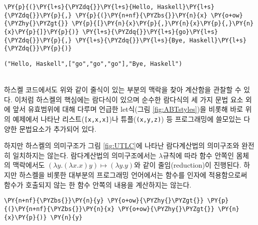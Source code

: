     
    \begin{tcolorbox}[breakable, size=fbox, boxrule=1pt, pad at break*=1mm,colback=cellbackground, colframe=cellborder, top=.75ex]
\begin{Verbatim}[commandchars=\\\{\}]
\PY{p}{(}\PY{l+s}{\PYZdq{}}\PY{l+s}{Hello, Haskell}\PY{l+s}{\PYZdq{}}\PY{p}{,} \PY{p}{(}\PY{n+nf}{\PYZbs{}}\PY{n}{x} \PY{o+ow}{\PYZhy{}\PYZgt{}} \PY{p}{[}\PY{n}{x}\PY{p}{,}\PY{n}{x}\PY{p}{,}\PY{n}{x}\PY{p}{]}\PY{p}{)} \PY{l+s}{\PYZdq{}}\PY{l+s}{go}\PY{l+s}{\PYZdq{}}\PY{p}{,} \PY{l+s}{\PYZdq{}}\PY{l+s}{Bye, Haskell}\PY{l+s}{\PYZdq{}}\PY{p}{)}
\end{Verbatim}
\end{tcolorbox}

    
    \begin{Verbatim}[commandchars=\\\{\}]
("Hello, Haskell",["go","go","go"],"Bye, Haskell")
    \end{Verbatim}

    ~\\[-2ex]\noindent
    하스켈 코드에서도 위와 같이 줄식이 있는 부분의 맥락을 찾아 계산함을
관찰할 수 있다. 이처럼 하스켈의 핵심에는 람다식이 있으며 순수한 람다식의
세 가지 문법 요소 외에 앞서 유효범위에 대해 다루며 언급한 let식(그림
\ref{fig:ABTstyles})을 비롯해 바로 위의 예제에서 나타난
리스트(\texttt{{[}x,x,x{]}})나 튜플(\texttt{(x,y,z)}) 등 프로그래밍에
쓸모있는 다양한 문법요소가 추가되어 있다.

    하지만 하스켈의 의미구조가 그림 \ref{fig:UTLC}에 나타난 람다계산법의
의미구조와 완전히 일치하지는 않는다. 람다계산법의 의미구조에서는
\(\lambda\)규칙에 따라 함수 안쪽인 몸체의 맥락에서도
\((\lambda y.(\lambda x.x) y) \longmapsto (\lambda y.y)\)와 같이
줄임(reduction)이 진행된다. 하지만 하스켈을 비롯한 대부분의 프로그래밍
언어에서는 함수를 인자에 적용함으로써 함수가 호출되지 않는 한 함수
안쪽의 내용을 계산하지는 않는다.

    \begin{tcolorbox}[breakable, size=fbox, boxrule=1pt, pad at break*=1mm,colback=cellbackground, colframe=cellborder, top=.75ex]
\begin{Verbatim}[commandchars=\\\{\}]
\PY{n+nf}{\PYZbs{}}\PY{n}{y} \PY{o+ow}{\PYZhy{}\PYZgt{}} \PY{p}{(}\PY{n+nf}{\PYZbs{}}\PY{n}{x} \PY{o+ow}{\PYZhy{}\PYZgt{}} \PY{n}{x}\PY{p}{)} \PY{n}{y}
\end{Verbatim}
\end{tcolorbox}

